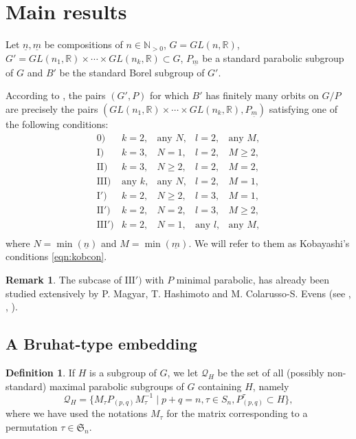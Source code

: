 \documentclass[pdftex]{sigma}
\numberwithin{equation}{section}
\theoremstyle{definition}
\newtheorem{Definition}[Theorem]{Definition}
\newtheorem{Remark}[Theorem]{Remark}
\newcommand{\R}{\mathbb{R}}
\newcommand{\N}{\mathbb{N}}
\theoremstyle{plain}
\theoremstyle{plain}
\theoremstyle{plain}
\theoremstyle{plain}
\begin{document}
\section{Main results}

Let $\underline n, \underline m$ be compositions of $n \in \N_{>0}$, $G = GL(n,\R)$, $G' = GL(n_1,\R) \times \cdots \times GL(n_k,\R) \subset G$, $P_{\underline m}$ be a standard parabolic subgroup of $G$ and $B'$ be the standard Borel subgroup of $G'$.

According to \cite[Theorem A]{ActionVisible}, the pairs $(G',P)$ for which $B'$ has finitely many orbits on $G/P$ are precisely the pairs $(GL(n_1,\R)\times \cdots \times GL(n_k,\R), P_{\underline m})$ satisfying one of the following conditions:
\begin{equation}\label{eqn:kobcon}
	\begin{array}{rcccc}
		0) & k = 2, & \text{any } N, & l=2, & \text{any } M,\\
		\mathrm{I}) & k = 3, & N = 1, & l = 2, & M \geqslant 2,\\
		\mathrm{II}) & k = 3, & N \geqslant 2, & l = 2, & M = 2, \\
		\mathrm{III}) & \text{any } k, & \text{any } N, & l = 2, & M = 1, \\
		\mathrm{I}') & k = 2, & N \geqslant 2, & l = 3, & M = 1,\\
		\mathrm{II}') & k = 2, & N = 2, & l = 3, & M \geqslant 2,\\
		\mathrm{III}') & k = 2, & N = 1, & \text{any } l, & \text{any } M, \\
	\end{array}
\end{equation}
where $N = \min(\underline n)$ and $M = \min(\underline m)$. We will refer to them as Kobayashi's conditions \eqref{eqn:kobcon}.

\begin{Remark}
	The subcase of $\mathrm{III}')$ with $P$ minimal parabolic, has already been studied extensively by P. Magyar, T. Hashimoto and M. Colarusso-S. Evens (see \cite{Magyar}, \cite{Hashimoto}, \cite{ColarussoEvens}).
\end{Remark}

\subsection{A Bruhat-type embedding}

\begin{Definition}{\label{def Q_H}}
	If $H$ is a subgroup of $G$, we let $\mathcal Q_H$ be the set of all (possibly non-standard) maximal parabolic subgroups of $G$ containing $H$, namely
	\begin{equation*}
		\mathcal Q_H = \{M_\tau P_{(p,q)}M_\tau^{-1} \mid p+q = n, \tau \in S_n, P_{(p,q)}^\tau \subset H\},
	\end{equation*}
	where we have used the notations $M_\tau$ for the matrix corresponding to a permutation $\tau \in \mathfrak S_n$.
\end{Definition}
\end{document}
